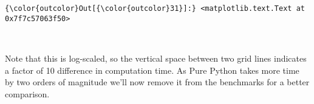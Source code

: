 \documentclass{article}
\begin{document}
            \begin{Verbatim}[commandchars=\\\{\}]
{\color{outcolor}Out[{\color{outcolor}31}]:} <matplotlib.text.Text at 0x7f7c57063f50>
\end{Verbatim}
        
    \begin{center}
    \end{center}
    { \hspace*{\fill} \\}
    
    Note that this is log-scaled, so the vertical space between two grid
lines indicates a factor of 10 difference in computation time. As Pure
Python takes more time by two orders of magnitude we'll now remove it
from the benchmarks for a better comparison.
\end{document}
